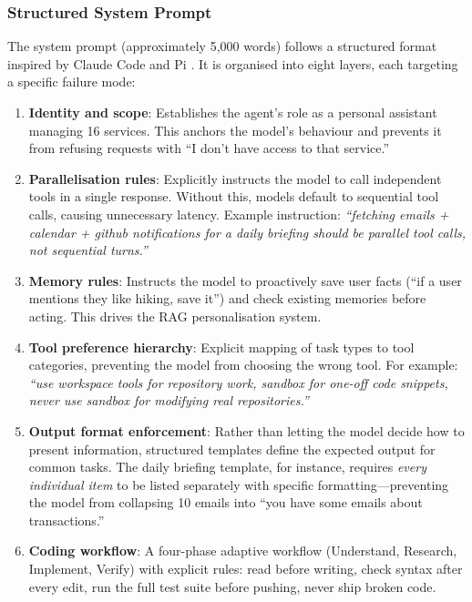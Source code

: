 \subsubsection{Structured System Prompt}

The system prompt (approximately 5,000 words) follows a structured format inspired by Claude Code \cite{anthropic2025claudecode} and Pi \cite{badlogic2025pi}. It is organised into eight layers, each targeting a specific failure mode:

\begin{enumerate}[leftmargin=*]
  \item \textbf{Identity and scope}: Establishes the agent's role as a personal assistant managing 16 services. This anchors the model's behaviour and prevents it from refusing requests with ``I don't have access to that service.''

  \item \textbf{Parallelisation rules}: Explicitly instructs the model to call independent tools in a single response. Without this, models default to sequential tool calls, causing unnecessary latency. Example instruction: \textit{``fetching emails + calendar + github notifications for a daily briefing should be parallel tool calls, not sequential turns.''}

  \item \textbf{Memory rules}: Instructs the model to proactively save user facts (``if a user mentions they like hiking, save it'') and check existing memories before acting. This drives the RAG personalisation system.

  \item \textbf{Tool preference hierarchy}: Explicit mapping of task types to tool categories, preventing the model from choosing the wrong tool. For example: \textit{``use workspace tools for repository work, sandbox for one-off code snippets, never use sandbox for modifying real repositories.''}

  \item \textbf{Output format enforcement}: Rather than letting the model decide how to present information, structured templates define the expected output for common tasks. The daily briefing template, for instance, requires \textit{every individual item} to be listed separately with specific formatting---preventing the model from collapsing 10 emails into ``you have some emails about transactions.''

  \item \textbf{Coding workflow}: A four-phase adaptive workflow (Understand, Research, Implement, Verify) with explicit rules: read before writing, check syntax after every edit, run the full test suite before pushing, never ship broken code.


\end{enumerate}
